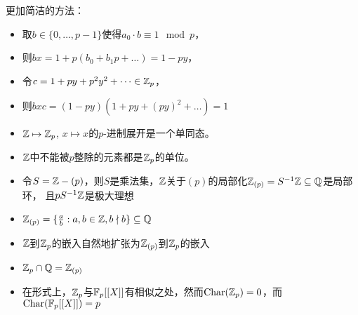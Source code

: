 \documentclass[11pt]{article}
\DeclareMathOperator{\Char}{Char}
\begin{document}
更加简洁的方法：
\begin{itemize}
\item 取\(b\in\{0,\dots,p-1\}\)使得\(a_0\cdot b\equiv 1\mod p\)，
\item 则\(bx=1+p(b_0+b_1p+\dots)=1-py\)，
\item 令\(c=1+py+p^2y^2+\dots\in\mathbb{Z}_p\)，
\item 则\(bxc=(1-py)(1+py+(py)^2+\dots)=1\)
\end{itemize}

\begin{remark}
\begin{itemize}
\item \(\mathbb{Z}\mapsto\mathbb{Z}_p\), \(x\mapsto x\)的\(p\)-进制展开是一个单同态。
\item \(\mathbb{Z}\)中不能被\(p\)整除的元素都是\(\mathbb{Z}_p\)的单位。
\item 令\(S=\mathbb{Z}-(p)\)，则\(S\)是乘法集，\(\mathbb{Z}\)关于\((p)\)的局部化\(\mathbb{Z}_{(p)}=S^{-1}\mathbb{Z}\subseteq\mathbb{Q}\)是局部环，
且\(pS^{-1}\mathbb{Z}\)是极大理想
\item \(\mathbb{Z}_{(p)}=\{\frac{a}{b}:a,b\in\mathbb{Z},b\nmid b\}\subseteq\mathbb{Q}\)
\item \(\mathbb{Z}\)到\(\mathbb{Z}_p\)的嵌入自然地扩张为\(\mathbb{Z}_{(p)}\)到\(\mathbb{Z}_p\)的嵌入
\begin{center}\end{center}
\item \(\mathbb{Z}_p\cap\mathbb{Q}=\mathbb{Z}_{(p)}\)
\item 在形式上，\(\mathbb{Z}_p\)与\(\mathbb{F}_p[[X]]\)有相似之处，然而\(\Char(\Z_p)=0\)，而\(\Char(\F_p[[X]])=p\)
\end{itemize}
\end{remark}
\end{document}
